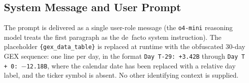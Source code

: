 \documentclass[jrfm,article,accept,moreauthors,pdftex]{Definitions/mdpi}
\begin{document}
\subsection{System Message and User Prompt}
\label{app:prompt:body}

The prompt is delivered as a single user-role message (the
\texttt{o4-mini} reasoning model treats the first paragraph as the
de~facto system instruction). The placeholder
\texttt{\{gex\_data\_table\}} is replaced at runtime with the
obfuscated 30-day GEX sequence: one line per day, in the format
\texttt{Day T-29: +3.42B} through \texttt{Day T + 0: $-$12.18B}, where the
calendar date has been replaced with a relative day label, and the
ticker symbol is absent. No other identifying context is {supplied.}%
\end{document}
